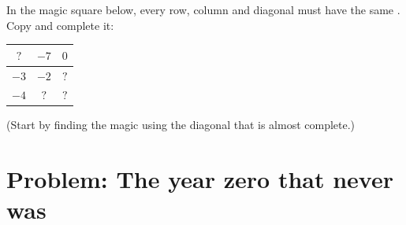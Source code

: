 \begin{exercise}[$\star\star\star$]\label{exo:g7:negatives:12}
In the magic square below, every row, column and diagonal must have
the same . Copy and complete it:
\begin{center}
\renewcommand{\arraystretch}{1.4}
\begin{tabular}{|c|c|c|}
\hline
$?$ & $-7$ & $0$ \\
\hline
$-3$ & $-2$ & $?$ \\
\hline
$-4$ & $?$ & $?$ \\
\hline
\end{tabular}
\end{center}
(Start by finding the magic  using the diagonal that is almost
complete.)
\end{exercise}

\section{Problem: The year zero that never was}

